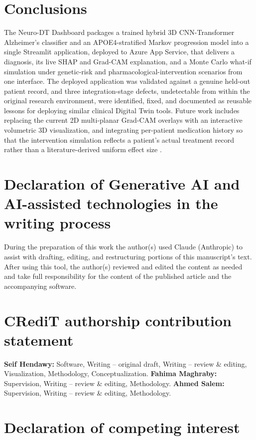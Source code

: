 \documentclass[5p,times,twocolumn]{elsarticle}
\begin{document}
\section{Conclusions}\label{sec5}

The Neuro-DT Dashboard packages a trained hybrid 3D CNN-Transformer Alzheimer's classifier and an APOE4-stratified Markov progression model into a single Streamlit application, deployed to Azure App Service, that delivers a diagnosis, its live SHAP and Grad-CAM explanation, and a Monte Carlo what-if simulation under genetic-risk and pharmacological-intervention scenarios from one interface. The deployed application was validated against a genuine held-out patient record, and three integration-stage defects, undetectable from within the original research environment, were identified, fixed, and documented as reusable lessons for deploying similar clinical Digital Twin tools. Future work includes replacing the current 2D multi-planar Grad-CAM overlays with an interactive volumetric 3D visualization, and integrating per-patient medication history so that the intervention simulation reflects a patient's actual treatment record rather than a literature-derived uniform effect size \cite{bib_bdt}.

\section*{Declaration of Generative AI and AI-assisted technologies in the writing process}

During the preparation of this work the author(s) used Claude (Anthropic) to assist with drafting, editing, and restructuring portions of this manuscript's text. After using this tool, the author(s) reviewed and edited the content as needed and take full responsibility for the content of the published article and the accompanying software.

\section*{CRediT authorship contribution statement}

\textbf{Seif Hendawy:} Software, Writing -- original draft, Writing -- review \& editing, Visualization, Methodology, Conceptualization. \textbf{Fahima Maghraby:} Supervision, Writing -- review \& editing, Methodology. \textbf{Ahmed Salem:} Supervision, Writing -- review \& editing, Methodology.

\section*{Declaration of competing interest}
\end{document}
